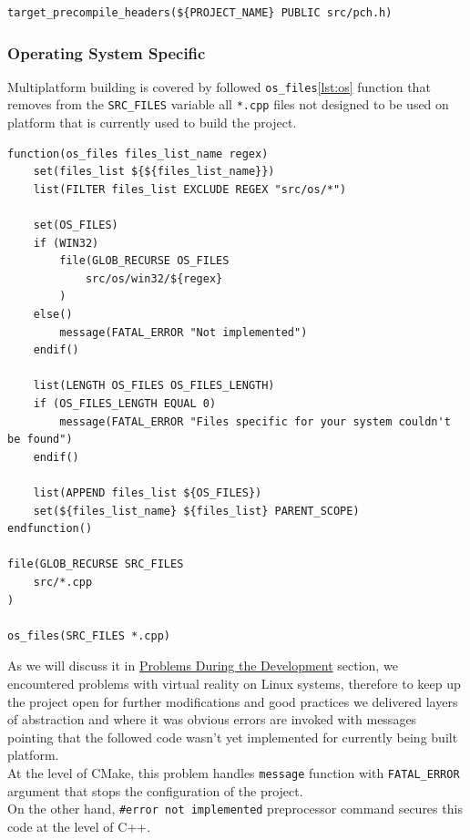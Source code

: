 \begin{lstlisting}[caption=Adding precompiled header(./engine/CMakeLists.txt)]
target_precompile_headers(${PROJECT_NAME} PUBLIC src/pch.h)
\end{lstlisting}

\subsubsection{Operating System Specific}
\label{sec:build_os}
Multiplatform building is covered by followed \texttt{os\_files}\ref{lst:os} function that removes from the \texttt{SRC\_FILES} variable all \texttt{*.cpp} files not designed to be used on platform that is currently used to build the project.
\label{lst:os}
\begin{lstlisting}[caption=os\_files function (./engine/CMakeLists.txt)]
function(os_files files_list_name regex)
    set(files_list ${${files_list_name}})
    list(FILTER files_list EXCLUDE REGEX "src/os/*")

    set(OS_FILES)
    if (WIN32)
        file(GLOB_RECURSE OS_FILES
            src/os/win32/${regex}
        )
    else()
        message(FATAL_ERROR "Not implemented")
    endif()

    list(LENGTH OS_FILES OS_FILES_LENGTH)
    if (OS_FILES_LENGTH EQUAL 0)
        message(FATAL_ERROR "Files specific for your system couldn't be found")
    endif()

    list(APPEND files_list ${OS_FILES})
    set(${files_list_name} ${files_list} PARENT_SCOPE)
endfunction()

file(GLOB_RECURSE SRC_FILES
    src/*.cpp
)

os_files(SRC_FILES *.cpp)
\end{lstlisting}
As we will discuss it in \hyperref[sec:problems]{Problems During the Development} section, we encountered problems with virtual reality on Linux systems, therefore to keep up the project open for further modifications and good practices we delivered layers of abstraction and where it was obvious errors are invoked with messages pointing that the followed code wasn't yet implemented for currently being built platform.\\ At the level of CMake, this problem handles \texttt{message} function with \texttt{FATAL\_ERROR} argument that stops the configuration of the project.\\ On the other hand, \texttt{\#error not implemented} preprocessor command secures this code at the level of C++.

